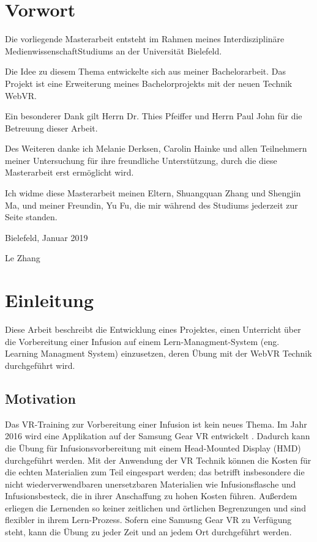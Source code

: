 \chapter*{Vorwort}

Die vorliegende Masterarbeit entsteht im Rahmen meines \glqq Interdisziplinäre Medienwissenschaft\grqq\-Studiums an der Universität Bielefeld.
 
Die Idee zu diesem Thema entwickelte sich aus meiner Bachelorarbeit. Das Projekt ist eine Erweiterung meines Bachelorprojekts mit der neuen Technik WebVR.
 
Ein besonderer Dank gilt Herrn Dr. Thies Pfeiffer und Herrn Paul John für die Betreuung dieser Arbeit.
 
Des Weiteren danke ich Melanie Derksen, Carolin Hainke und allen Teilnehmern meiner Untersuchung für ihre freundliche Unterstützung, durch die diese Masterarbeit erst ermöglicht wird.
 
Ich widme diese Masterarbeit meinen Eltern, Shuangquan Zhang und Shengjin Ma, und meiner Freundin, Yu Fu, die mir während des Studiums jederzeit zur Seite standen.

\vspace{5mm}
 
Bielefeld, Januar 2019
 
Le Zhang

\chapter{Einleitung}

Diese Arbeit beschreibt die Entwicklung eines Projektes, einen Unterricht über die Vorbereitung einer Infusion auf einem Lern-Managment-System (eng. Learning Managment System) einzusetzen, deren Übung mit der WebVR Technik durchgeführt wird.

\section{Motivation}

Das VR-Training zur Vorbereitung einer Infusion ist kein neues Thema. Im Jahr 2016 wird eine Applikation auf der Samsung Gear VR entwickelt \citep{26}. Dadurch kann die Übung für Infusionsvorbereitung mit einem Head-Mounted Display (HMD) durchgeführt werden. Mit der Anwendung der VR Technik können die Kosten für die echten Materialien zum Teil eingespart werden; das betrifft insbesondere die nicht wiederverwendbaren unersetzbaren Materialien wie Infusionsflasche und Infusionsbesteck, die in ihrer Anschaffung zu hohen Kosten führen. Außerdem erliegen die Lernenden so keiner zeitlichen und örtlichen Begrenzungen und sind flexibler in ihrem Lern-Prozess. Sofern eine Samusng Gear VR zu Verfügung steht, kann die Übung zu jeder Zeit und an jedem Ort durchgeführt werden.

